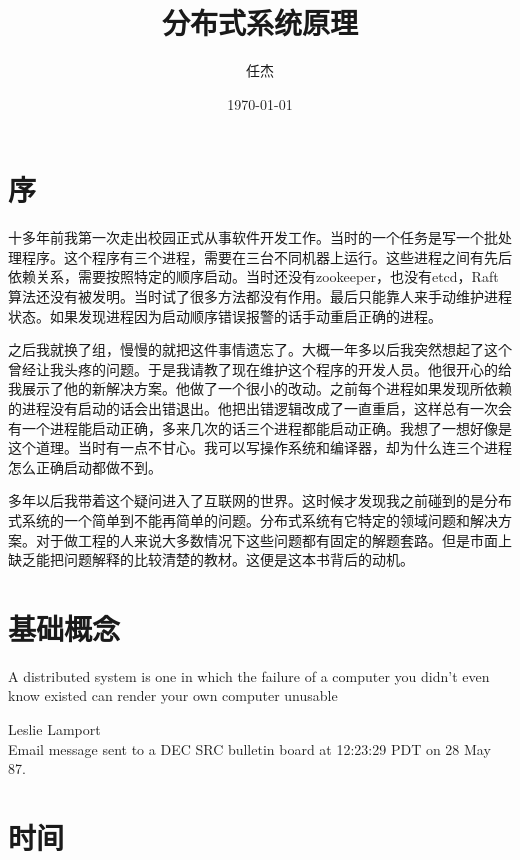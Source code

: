 \documentclass[reqno,heading=true,fontset=macnew]{ctexbook}
\begin{document}
\title{分布式系统原理}
\author{任杰}
\date{\today}

\maketitle
\tableofcontents


\chapter*{序}
十多年前我第一次走出校园正式从事软件开发工作。当时的一个任务是写一个批处理程序。这个程序有三个进程，需要在三台不同机器上运行。这些进程之间有先后依赖关系，需要按照特定的顺序启动。当时还没有zookeeper，也没有etcd，Raft算法还没有被发明。当时试了很多方法都没有作用。最后只能靠人来手动维护进程状态。如果发现进程因为启动顺序错误报警的话手动重启正确的进程。


之后我就换了组，慢慢的就把这件事情遗忘了。大概一年多以后我突然想起了这个曾经让我头疼的问题。于是我请教了现在维护这个程序的开发人员。他很开心的给我展示了他的新解决方案。他做了一个很小的改动。之前每个进程如果发现所依赖的进程没有启动的话会出错退出。他把出错逻辑改成了一直重启，这样总有一次会有一个进程能启动正确，多来几次的话三个进程都能启动正确。我想了一想好像是这个道理。当时有一点不甘心。我可以写操作系统和编译器，却为什么连三个进程怎么正确启动都做不到。


多年以后我带着这个疑问进入了互联网的世界。这时候才发现我之前碰到的是分布式系统的一个简单到不能再简单的问题。分布式系统有它特定的领域问题和解决方案。对于做工程的人来说大多数情况下这些问题都有固定的解题套路。但是市面上缺乏能把问题解释的比较清楚的教材。这便是这本书背后的动机。






\chapter{基础概念}

\epigraph{A distributed system is one in which the failure of a computer you didn't even know existed can render your own computer unusable}{Leslie Lamport \\ Email message sent to a DEC SRC bulletin board at 12:23:29 PDT on 28 May 87.}





\chapter{时间}
\end{document}
